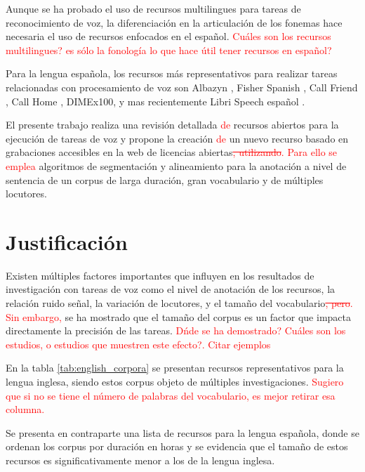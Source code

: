 \documentclass[a4paper,12pt,twoside]{report}
\newcommand{\macb}{\textcolor{red}}
\begin{document}
Aunque se ha probado el uso de recursos multilingues para tareas de reconocimiento de voz, la diferenciación en la articulación de los fonemas hace necesaria el uso de recursos enfocados en el español. \macb{Cu\'ales son los recursos multilingues? es sólo la fonolog\'ia lo que hace \'util tener recursos en espa\~nol?}

Para la lengua española, los recursos más representativos para realizar tareas relacionadas con procesamiento de voz son Albazyn \cite{CampilloAlbayzinEvaluation}, Fisher Spanish \cite{FischerSpa}, Call Friend \cite{CALLFRIENDSpa}, Call Home \cite{CALLHOMESpa}, DIMEx100\cite{Pineda2004DIMEx100:Spanish}, y mas recientemente Libri Speech español \cite{LibriVox-Spanish}.



El presente trabajo realiza una revisión detallada \macb{de} recursos abiertos para la ejecución de tareas de voz y propone la creación \macb{de} un nuevo recurso basado en grabaciones accesibles en la web de licencias abiertas\macb{\st{, utilizando}. Para ello se emplea} algoritmos de segmentación y alineamiento para la anotación a nivel de sentencia de un corpus de larga duración, gran vocabulario y de múltiples locutores.


\section{Justificación}


Existen múltiples factores importantes que influyen en los resultados de investigación con tareas de voz como el nivel de anotación de los recursos, la relación ruido señal, la variación de locutores, y el tamaño del vocabulario\macb{\st{, pero}. Sin embargo, } se ha mostrado que el tamaño del corpus es un factor que impacta directamente la precisión de las tareas. \macb{D\'nde se ha demostrado? Cu\'ales son los estudios, o estudios que muestren este efecto?. Citar ejemplos}

En la tabla \ref{tab:english_corpora} se presentan recursos representativos para la lengua inglesa, siendo estos corpus objeto de múltiples investigaciones. \macb{Sugiero que si no se tiene el n\'umero de palabras del vocabulario, es mejor retirar esa columna.}



Se presenta en contraparte una lista de recursos para la lengua española, donde se ordenan los corpus por duración en horas y se evidencia que el tamaño de estos recursos es significativamente  menor a los de la lengua inglesa.
\end{document}
